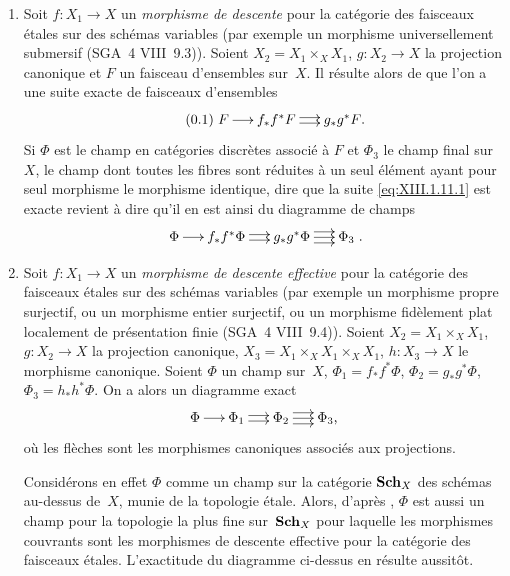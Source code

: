 \begin{exemples}
\label{XIII.1.11}
\begin{enumerate}
\item[1)] Soit $f \colon X_1 \to X$ un \emph{morphisme de descente}
pour la cat\'egorie des faisceaux \'etales sur des sch\'emas
variables (par exemple un morphisme universellement submersif (SGA~4
VIII~9.3)). Soient $X_2 = X_1 \times_X X_1$, $g \colon X_2 \to X$ la
projection canonique et $F$ un faisceau d'ensembles sur~$X$. Il
r\'esulte alors de \loccit que l'on a une suite exacte de
faisceaux d'ensembles
\begin{equation*}
\label{eq:XIII.1.11.1}
\tag{\thesubsection.1} { \xymatrix@C=.5cm{{F}\ar[r]&{f_* f^* F}\ar@<2pt>[r]\ar@<-2pt>[r]&{g_* g^* F \text{.}}}
}
\end{equation*}
Si $\Phi$ est le champ en cat\'egories discr\`etes associ\'e
\`a $F$ et $\Phi_3$ le champ final sur~$X$, \ie le champ dont
toutes les fibres sont r\'eduites \`a un seul \'el\'ement
ayant pour seul morphisme le morphisme identique, dire que la suite
\eqref{eq:XIII.1.11.1} est exacte revient \`a dire qu'il en est
ainsi du diagramme de champs
$$
\xymatrix@C=.5cm{{\Phi}\ar[r]&{f_* f^* \Phi}\ar@<2pt>[r]\ar@<-2pt>[r]&{g_* g^* \Phi}\ar[r]\ar@<4pt>[r]\ar@<-4pt>[r]&{\Phi_3}} \text{.}
$$

\item[2)]
Soit
$f \colon X_1 \to X$ un \emph{morphisme de descente effective}
pour la cat\'egorie des faisceaux \'etales sur des sch\'emas
variables (par exemple un morphisme propre surjectif, ou un morphisme
entier surjectif, ou un morphisme fid\`element plat localement de
pr\'esentation finie (SGA~4 VIII~9.4)). Soient $X_2 = X_1 \times_X
X_1$, $g \colon X_2 \to X$ la projection canonique, $X_3 = X_1
\times_X X_1 \times_X X_1$, $h \colon X_3 \to X$ le morphisme
canonique. Soient $\Phi$ un champ sur~$X$, $\Phi_1 = f_* f^* \Phi$,
$\Phi_2 = g_* g^* \Phi$, $\Phi_3 = h_* h^* \Phi$. On a alors un
diagramme exact
$$
\xymatrix@C=.5cm{{\Phi}\ar[r]&{\Phi_1}\ar@<2pt>[r]\ar@<-2pt>[r]&{\Phi_2}\ar[r]\ar@<4pt>[r]\ar@<-4pt>[r]&{\Phi_3 \text{,}}}
$$
o\`u les fl\`eches sont les morphismes canoniques associ\'es aux
projections.

Consid\'erons en effet $\Phi$ comme un champ sur la cat\'egorie
$\mathbf{Sch}_X$ des sch\'emas au-dessus de~$X$, munie de la topologie
\'etale. Alors, d'apr\`es \cite[VII 2.2.8]{XIII.2}, $\Phi$ est aussi un
champ pour la topologie la plus fine sur~$\mathbf{Sch}_X$ pour laquelle les
morphismes couvrants sont les morphismes de descente effective pour la
cat\'egorie des faisceaux \'etales. L'exactitude du diagramme
ci-dessus en r\'esulte aussit\^ot.
\end{enumerate}
\end{exemples}

